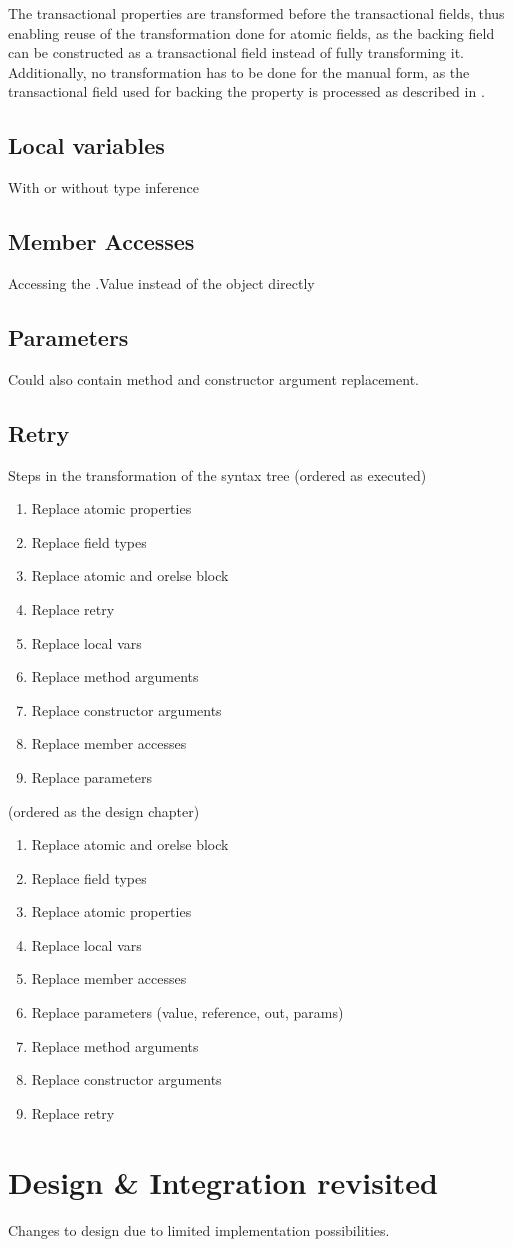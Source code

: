 The transactional properties are transformed before the transactional fields, thus enabling reuse of the transformation done for atomic fields, as the backing field can be constructed as a transactional field instead of fully transforming it. Additionally, no transformation has to be done for the manual form, as the transactional field used for backing the property is processed as described in . 


\subsection{Local variables}
With or without type inference

\subsection{Member Accesses}
Accessing the .Value instead of the object directly

\subsection{Parameters}
Could also contain method and constructor argument replacement.

\subsection{Retry}

Steps in the transformation of the syntax tree (ordered as executed)
\begin{enumerate}
	\item Replace atomic properties
	\item Replace field types
	\item Replace atomic and orelse block
	\item Replace retry
	\item Replace local vars
	\item Replace method arguments
	\item Replace constructor arguments
	\item Replace member accesses
	\item Replace parameters
\end{enumerate}

(ordered as the design chapter)
\begin{enumerate}
	\item Replace atomic and orelse block
	\item Replace field types
	\item Replace atomic properties
	\item Replace local vars
	\item Replace member accesses
	\item Replace parameters (value, reference, out, params)
	\item Replace method arguments
	\item Replace constructor arguments
	\item Replace retry
\end{enumerate}

\section{Design \& Integration revisited}
Changes to design due to limited implementation possibilities.
\worksheetend